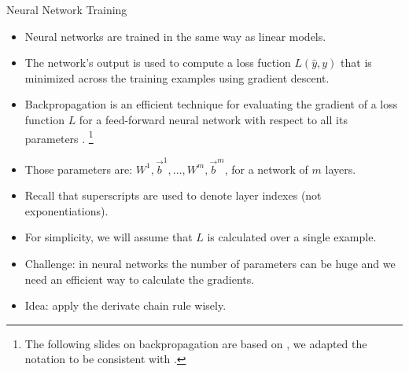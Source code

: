 \documentclass[handout]{beamer}
\begin{document}
\begin{frame}{Neural Network Training}
\begin{scriptsize}


\begin{itemize}
\item Neural networks are trained in the same way as linear models.

\item The network's output is used to compute a loss fuction $L(\hat{y},y)$ that is minimized across the training examples using gradient descent. 
\item Backpropagation is an efficient technique for evaluating the gradient
of a loss function $L$ for a feed-forward neural network with respect to all its parameters \cite{bishop2006pattern}. \footnote{The following slides on backpropagation are based on \cite{bishop2006pattern}, we adapted the notation to be consistent with \cite{goldberg2017neural}.}
\item Those parameters are: $W^1, \vec{b}^1, \dots, W^m, \vec{b}^m$, for a network of $m$ layers.
\item Recall that superscripts are used to denote layer indexes (not exponentiations).
\item For simplicity, we will assume that $L$ is calculated over a single example.
\item Challenge: in neural networks the number of parameters can be huge and we need an efficient way to calculate the gradients.

\item Idea: apply the derivate chain rule wisely.

\end{itemize}


\end{scriptsize}
\end{frame}
\end{document}
